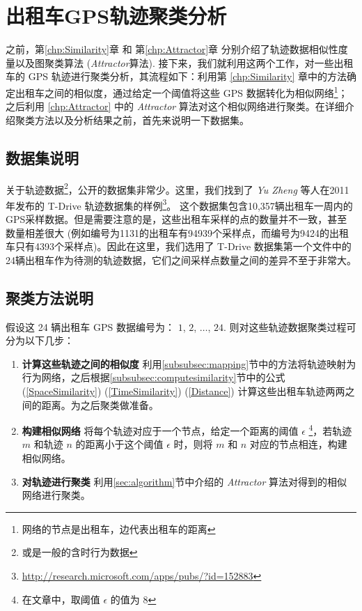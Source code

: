 
\chapter{出租车GPS轨迹聚类分析}
\label{chp:Experiments}
之前，第\ref{chp:Similarity}章 和 第\ref{chp:Attractor}章 分别介绍了轨迹数据相似性度量以及图聚类算法 (\emph{Attractor}算法). 接下来，我们就利用这两个工作，对一些出租车的 GPS 轨迹进行聚类分析，其流程如下：利用第 \ref{chp:Similarity} 章中的方法确定出租车之间的相似度，通过给定一个阈值将这些 GPS 数据转化为相似网络\footnote{网络的节点是出租车，边代表出租车的距离}；之后利用 \ref{chp:Attractor} 中的 \emph{Attractor} 算法对这个相似网络进行聚类。在详细介绍聚类方法以及分析结果之前，首先来说明一下数据集。

\section{数据集说明}
关于轨迹数据\footnote{或是一般的含时行为数据}，公开的数据集非常少。这里，我们找到了 \emph{Yu Zheng} 等人在2011年发布的 T-Drive 轨迹数据集的样例\footnote{\url{http://research.microsoft.com/apps/pubs/?id=152883}}。 这个数据集包含10,357辆出租车一周内的GPS采样数据。但是需要注意的是，这些出租车采样的点的数量并不一致，甚至数量相差很大 (例如编号为1131的出租车有94939个采样点，而编号为9424的出租车只有4393个采样点)。因此在这里，我们选用了 T-Drive 数据集第一个文件中的24辆出租车作为待测的轨迹数据，它们之间采样点数量之间的差异不至于非常大。

\section{聚类方法说明}
假设这 24 辆出租车 GPS 数据编号为： $1$, $2$, $\ldots$, $24$. 则对这些轨迹数据聚类过程可分为以下几步：
\begin{enumerate}
\item \textbf{计算这些轨迹之间的相似度} 利用\ref{subsubsec:mapping}节中的方法将轨迹映射为行为网络，之后根据\ref{subsubsec:computesimilarity}节中的公式 (\ref{SpaceSimilarity}) (\ref{TimeSimilarity}) (\ref{Distance}) 计算这些出租车轨迹两两之间的距离。为之后聚类做准备。
\item \textbf{构建相似网络} 将每个轨迹对应于一个节点，给定一个距离的阈值 $\epsilon$ \footnote{在文章中，取阈值 $\epsilon$ 的值为 8}，若轨迹 $m$ 和轨迹 $n$ 的距离小于这个阈值 $\epsilon$ 时，则将 $m$ 和 $n$ 对应的节点相连，构建相似网络。
\item \textbf{对轨迹进行聚类} 利用\ref{sec:algorithm}节中介绍的 \emph{Attractor} 算法对得到的相似网络进行聚类。
\end{enumerate}

